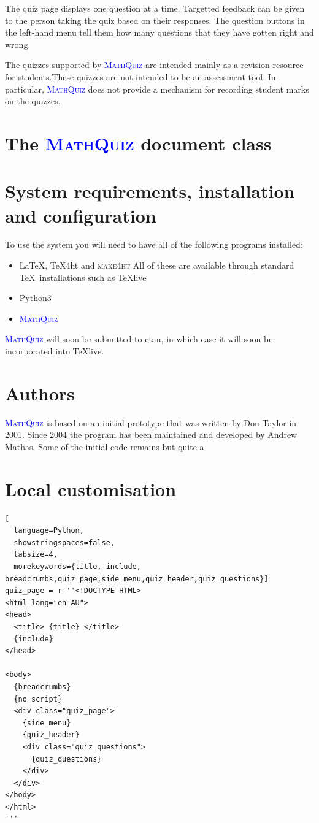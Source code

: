 \documentclass[svgnames]{article}
\def\MathQuiz{\textcolor{blue}{\textsc{MathQuiz}}\xspace}
\begin{document}
    The quiz page displays one question at a time. Targetted feedback
    can be given to the person taking the quiz based on their responses.
    The question buttons in the left-hand menu tell them how many
    questions that they have gotten right and wrong.

    The quizzes supported by \MathQuiz are intended mainly as a revision
    resource for students.These quizzes are not intended to be an
    assessment tool. In particular, \MathQuiz does not provide a
    mechanism for recording student marks on the quizzes.

    \section{The \MathQuiz document class}
    \section{System requirements, installation and configuration}

    To use the system you will need to have all of the following programs installed:
    \begin{itemize}
         \item \LaTeX, \TeX 4ht and \textsc{make4ht}
         All of these are available through standard \TeX\ installations
         such as \TeX live
         \item Python3
         \item \MathQuiz
    \end{itemize}

    \MathQuiz will soon be submitted to ctan, in which case it will soon
    be incorporated into \TeX live.

    \section{Authors}

\MathQuiz is based on an initial prototype that was written by Don Taylor in
2001. Since 2004 the program has been maintained and developed by Andrew
Mathas. Some of the initial code remains but quite a

\section{Local customisation}

\begin{lstlisting}[
  language=Python,
  showstringspaces=false,
  tabsize=4,
  morekeywords={title, include, breadcrumbs,quiz_page,side_menu,quiz_header,quiz_questions}]
quiz_page = r'''<!DOCTYPE HTML>
<html lang="en-AU">
<head>
  <title> {title} </title>
  {include}
</head>

<body>
  {breadcrumbs}
  {no_script}
  <div class="quiz_page">
    {side_menu}
    {quiz_header}
    <div class="quiz_questions">
      {quiz_questions}
    </div>
  </div>
</body>
</html>
'''
\end{lstlisting}
\end{document}
